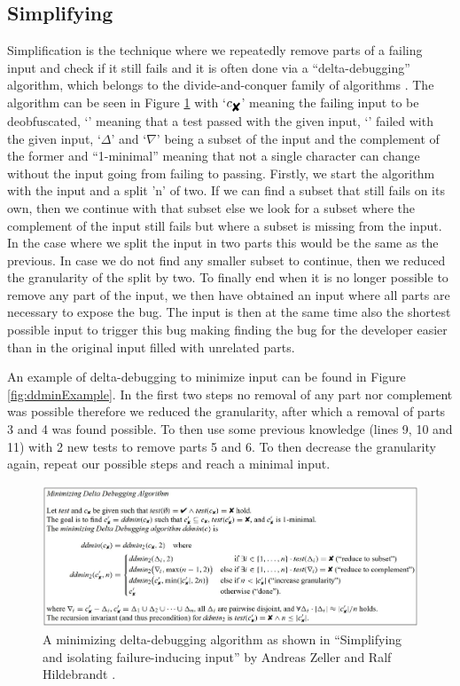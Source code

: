 \subsection{Simplifying}
\label{inputReduction:Simplifying}
Simplification is the technique where we repeatedly remove parts of a failing input and check if it still fails and it is often done via a “delta-debugging” algorithm, which belongs to the divide-and-conquer family of algorithms \cite{2FuzzingAndDeltaDebuggingSMTSolvers}. 
The algorithm can be seen in Figure \ref{fig:ddmin} with 
‘$ c_{\mbox{\ding{56}}} $’  %
meaning the failing input to be deobfuscated,
‘’ %
meaning that a test passed with the given input,
‘’ %
failed with the given input, 
‘$\Delta$’ and ‘$\nabla$’ being a subset of the input and the complement of the former and
“1-minimal” meaning that not a single character can change without the input going from failing to passing. Firstly, we start the algorithm with the input and a split ’n’ of two. If we can find a subset that still fails on its own, then we continue with that subset else we look for a subset where the complement of the input still fails but where a subset is missing from the input. In the case where we split the input in two parts this would be the same as the previous. In case we do not find any smaller subset to continue, then we reduced the granularity of the split by two. To finally end when it is no longer possible to remove any part of the input, we then have obtained an input where all parts are necessary to expose the bug. The input is then at the same time also the shortest possible input to trigger this bug making finding the bug for the developer easier than in the original input filled with unrelated parts. 

An example of delta-debugging to minimize input can be found in Figure \ref{fig:ddminExample}. In the first two steps no removal of any part nor complement was possible therefore we reduced the granularity, after which a removal of parts 3 and 4 was found possible. To then use some previous knowledge (lines 9, 10 and 11) with 2 new tests to remove parts 5 and 6. To then decrease the granularity again, repeat our possible steps and reach a minimal input.

\begin{figure}
	\centering
	\includegraphics[width=1.0\textwidth]{images/ddminFromPaper5edit}
	\caption{A minimizing delta-debugging algorithm as shown in “Simplifying and isolating failure-inducing input” by Andreas Zeller and Ralf Hildebrandt \cite{5zeller2002simplifyingIsolatingFailure-inducing}.}
	\label{fig:ddmin}
\end{figure}

